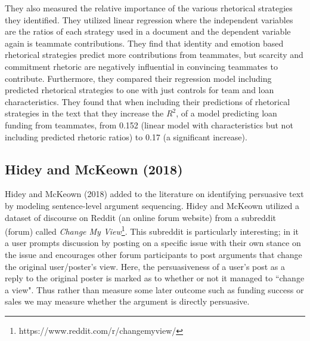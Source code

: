 \documentclass[11pt,a4paper]{article}
\begin{document}
They also measured the relative importance of the various rhetorical strategies they identified. They utilized linear regression where the independent variables are the ratios of  each strategy used in a document and the dependent variable again is teammate contributions. They find that identity and emotion based rhetorical strategies predict more contributions from teammates, but scarcity and commitment rhetoric are negatively influential in convincing teammates to contribute. Furthermore, they compared their regression model including predicted rhetorical strategies to one with just controls for team and loan characteristics. They found that when including their predictions of rhetorical strategies in the text that they increase the $R^2$, of a model predicting loan funding from teammates, from 0.152 (linear model with characteristics but not  including predicted rhetoric ratios) to 0.17 (a significant increase).

\subsection{Hidey and McKeown (2018) }
Hidey and McKeown (2018) added to the literature on identifying persuasive text by modeling sentence-level argument sequencing. Hidey and McKeown utilized a dataset of discourse on Reddit (an online forum website) from a subreddit (forum) called \textit{Change My View}\footnote{https://www.reddit.com/r/changemyview/}. This subreddit is particularly interesting; in it a user prompts discussion by posting on a specific issue with their own stance on the issue and encourages other forum participants to post arguments that change the original user/poster's view. Here, the persuasiveness of a user's post as a reply to the original poster is marked as to whether or not it managed to ``change a view". Thus rather than measure some later outcome such as funding success or sales we may measure whether the argument is directly persuasive. %
\end{document}
